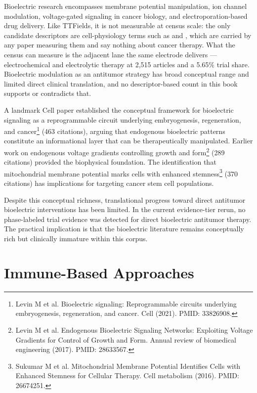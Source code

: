 \documentclass[11pt,twoside,openright]{report}
\begin{document}
Bioelectric research encompasses membrane potential manipulation, ion channel modulation, voltage-gated signaling in cancer biology, and electroporation-based drug delivery. Like TTFields, it is not measurable at census scale: the only candidate descriptors are cell-physiology terms such as  and , which are carried by any paper measuring them and say nothing about cancer therapy. What the census can measure is the adjacent lane the same electrode delivers --- electrochemical and electrolytic therapy at 2,515 articles and a 5.65\% trial share. Bioelectric modulation as an antitumor strategy has broad conceptual range and limited direct clinical translation, and no descriptor-based count in this book supports or contradicts that.

A landmark Cell paper established the conceptual framework for bioelectric signaling as a reprogrammable circuit underlying embryogenesis, regeneration, and cancer\footnote{Levin M et al. Bioelectric signaling: Reprogrammable circuits underlying embryogenesis, regeneration, and cancer. Cell (2021). PMID: 33826908.} (463 citations), arguing that endogenous bioelectric patterns constitute an informational layer that can be therapeutically manipulated. Earlier work on endogenous voltage gradients controlling growth and form\footnote{Levin M et al. Endogenous Bioelectric Signaling Networks: Exploiting Voltage Gradients for Control of Growth and Form. Annual review of biomedical engineering (2017). PMID: 28633567.} (289 citations) provided the biophysical foundation. The identification that mitochondrial membrane potential marks cells with enhanced stemness\footnote{Sukumar M et al. Mitochondrial Membrane Potential Identifies Cells with Enhanced Stemness for Cellular Therapy. Cell metabolism (2016). PMID: 26674251.} (370 citations) has implications for targeting cancer stem cell populations.

Despite this conceptual richness, translational progress toward direct antitumor bioelectric interventions has been limited. In the current evidence-tier rerun, no phase-labeled trial evidence was detected for direct bioelectric antitumor therapy. The practical implication is that the bioelectric literature remains conceptually rich but clinically immature within this corpus.

\section{Immune-Based Approaches}
\end{document}
